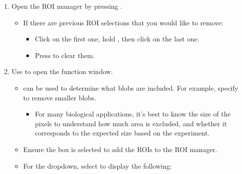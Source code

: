 \documentclass[letterpaper,10pt,english]{jupyterBook}
\begin{document}
\begin{enumerate}
%
\item {} 
\sphinxAtStartPar
Open the ROI manager by pressing .
\begin{itemize}
\item {} 
\sphinxAtStartPar
If there are previous ROI selections that you would like to remove:
\begin{itemize}
\item {} 
\sphinxAtStartPar
Click on the first one, hold , then click on the last one.

\item {} 
\sphinxAtStartPar
Press  to clear them.

\end{itemize}

\end{itemize}

\item {} 
\sphinxAtStartPar
Use  to open the function window.
\begin{itemize}
\item {} 
\sphinxAtStartPar
{} can be used to determine what blobs are included. For example, specify  to remove smaller blobs.
\begin{itemize}
\item {} 
\sphinxAtStartPar
For many biological applications, it’s best to know the size of the pixels to understand how much area is excluded, and whether it corresponds to the expected size based on the experiment.

\end{itemize}

\item {} 
\sphinxAtStartPar
Ensure the  box is selected to add the ROIs to the ROI manager.

\item {} 
\sphinxAtStartPar
For the  dropdown, select  to display the following:

\end{itemize}

\end{enumerate}

\sphinxAtStartPar
{}
\end{document}
